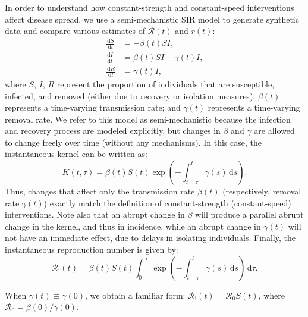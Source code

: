 \documentclass[12pt]{article}
\newcommand{\Rx}[1]{\ensuremath{{\mathcal R}_{#1}}\xspace}
\newcommand{\Ro}{\Rx{0}}
\newcommand{\Ri}{\Rx{\mathrm{i}}}
\newcommand{\RR}{\ensuremath{{\mathcal R}}\xspace}
\newcommand{\dd}[1]{\ensuremath{\, \mathrm{d}#1}}
\newcommand{\dtau}{\dd{\tau}}
\begin{document}
In order to understand how constant-strength and constant-speed interventions affect disease spread, we use a semi-mechanistic SIR model to generate synthetic data and compare various estimates of $\RR(t)$ and $r(t)$:
\begin{align}
\frac{\dd{S}}{\dd{t}} &= - \beta(t)S I, \label{eq:dSdt}\\
\frac{\dd{I}}{\dd{t}} &= \beta(t)S I - \gamma(t) I,\\
\frac{\dd{R}}{\dd{t}} &= \gamma(t) I,  \label{eq:dRdt}
\end{align}
where $S$, $I$, $R$ represent the proportion of individuals that are susceptible, infected, and removed (either due to recovery or isolation measures);
$\beta(t)$ represents a time-varying transmission rate; and $\gamma(t)$ represents a time-varying removal rate.
We refer to this model as semi-mechanistic because the infection and recovery process are modeled explicitly, but changes in $\beta$ and $\gamma$ are allowed to change freely over time (without any mechanisms).
In this case, the instantaneous kernel can be written as:
\begin{equation}
K(t, \tau) = \beta(t) S(t) \exp\left(-\int_{t-\tau}^t \gamma(s) \dd{s} \right).
\end{equation}
Thus, changes that affect only the transmission rate $\beta(t)$ (respectively, removal rate $\gamma(t)$) exactly match the definition of constant-strength (constant-speed) interventions.
Note also that an abrupt change in $\beta$ will produce a parallel abrupt change in the kernel, and thus in incidence, while an abrupt change in $\gamma(t)$ will not have an immediate effect, due to delays in isolating individuals.
Finally, the instantaneous reproduction number is given by:
\begin{equation}
\Ri(t) = \beta(t) S(t) \int_0^\infty \exp\left(-\int_{t-\tau}^t \gamma(s) \dd{s} \right) \dtau.
\end{equation}

When $\gamma(t) \equiv \gamma(0)$, we obtain a familiar form: $\Ri(t) = \Ro S(t)$,
where $\Ro = \beta(0)/\gamma(0)$.
\end{document}
